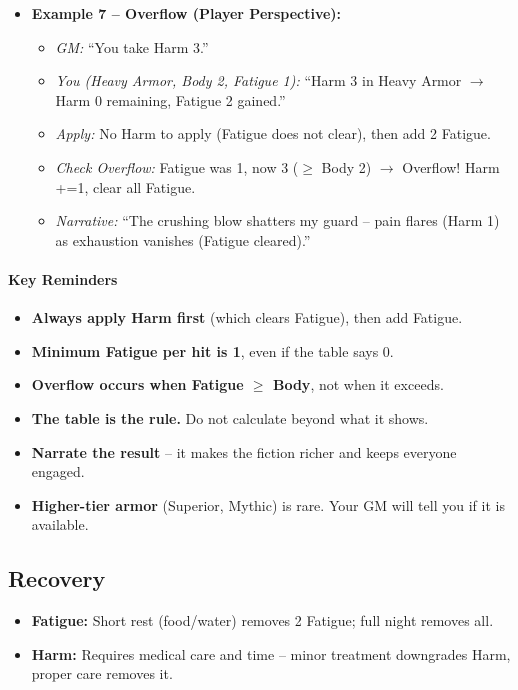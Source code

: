 \begin{itemize}
  \item \textbf{Example 7 -- Overflow (Player Perspective):}
        \begin{itemize}
          \item \textit{GM:} ``You take Harm 3.''
          \item \textit{You (Heavy Armor, Body 2, Fatigue 1):} ``Harm 3 in Heavy Armor $\to$ Harm 0 remaining, Fatigue 2 gained.''
          \item \textit{Apply:} No Harm to apply (Fatigue does not clear), then add 2 Fatigue.
          \item \textit{Check Overflow:} Fatigue was 1, now 3 ($\geq$ Body 2) $\to$ Overflow! Harm +=1, clear all Fatigue.
          \item \textit{Narrative:} ``The crushing blow shatters my guard -- pain flares (Harm 1) as exhaustion vanishes (Fatigue cleared).''
        \end{itemize}
\end{itemize}

\paragraph{Key Reminders}
\begin{itemize}
  \item \textbf{Always apply Harm first} (which clears Fatigue), then add Fatigue.
  \item \textbf{Minimum Fatigue per hit is 1}, even if the table says 0.
  \item \textbf{Overflow occurs when Fatigue $\geq$ Body}, not when it exceeds.
  \item \textbf{The table is the rule.} Do not calculate beyond what it shows.
  \item \textbf{Narrate the result} -- it makes the fiction richer and keeps everyone engaged.
  \item \textbf{Higher-tier armor} (Superior, Mythic) is rare. Your GM will tell you if it is available.
\end{itemize}

\subsection{Recovery}
\label{sec:harm-fatigue-recovery}
\begin{itemize}
  \item \textbf{Fatigue:} Short rest (food/water) removes 2 Fatigue; full night removes all.
  \item \textbf{Harm:} Requires medical care and time -- minor treatment downgrades Harm, proper care removes it.
\end{itemize}

